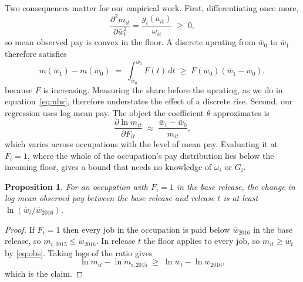 \documentclass[12pt,leqno]{article}
\newtheorem{proposition}{Proposition}
\begin{document}
Two consequences matter for our empirical work. First, differentiating once more,
\begin{equation}
\frac{\partial^{2} m_{it}}{\partial \bar{w}_t^{2}} = \frac{g_i(a_{it})}{\omega_{it}} \;\geq\; 0,
\end{equation}
so mean observed pay is convex in the floor. A discrete uprating from $\bar{w}_0$ to $\bar{w}_1$ therefore satisfies
\begin{equation}\label{eq:discrete}
m(\bar{w}_1) - m(\bar{w}_0) \;=\; \int_{\bar{w}_0}^{\bar{w}_1} F(t)\, dt \;\geq\; F(\bar{w}_0)\left(\bar{w}_1 - \bar{w}_0\right),
\end{equation}
because $F$ is increasing. Measuring the share before the uprating, as we do in equation~\eqref{eq:nlw}, therefore understates the effect of a discrete rise. Second, our regression uses log mean pay. The object the coefficient $\theta$ approximates is
\begin{equation}
\frac{\partial \ln m_{it}}{\partial F_{it}} \;\approx\; \frac{\bar{w}_1 - \bar{w}_0}{m_{it}},
\end{equation}
which varies across occupations with the level of mean pay. Evaluating it at $F_i = 1$, where the whole of the occupation's pay distribution lies below the incoming floor, gives a bound that needs no knowledge of $\omega_i$ or $G_i$.

\begin{proposition}\label{prop:bound}
For an occupation with $F_i = 1$ in the base release, the change in log mean observed pay between the base release and release $t$ is at least $\ln\!\left(\bar{w}_t / \bar{w}_{2016}\right)$.
\end{proposition}

\begin{proof}
If $F_i = 1$ then every job in the occupation is paid below $\bar{w}_{2016}$ in the base release, so $m_{i,2015} \leq \bar{w}_{2016}$. In release $t$ the floor applies to every job, so $m_{it} \geq \bar{w}_t$ by \eqref{eq:obs}. Taking logs of the ratio gives
\begin{equation}
\ln m_{it} - \ln m_{i,2015} \;\geq\; \ln \bar{w}_t - \ln \bar{w}_{2016},
\end{equation}
which is the claim.
\end{proof}
\end{document}
